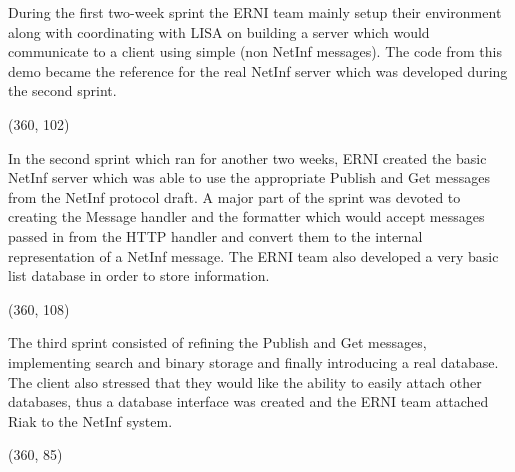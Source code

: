 During the first two-week sprint the ERNI team mainly setup their environment along with coordinating with LISA on building a server which would communicate to a client using simple (non NetInf messages). The code from this demo became the reference for the real NetInf server which was developed during the second sprint.

\framebox(360, 102){
}

In the second sprint which ran for another two weeks, ERNI created the basic NetInf server which was able to use the appropriate Publish and Get messages from the NetInf protocol draft. A major part of the sprint was devoted to creating the Message handler and the formatter which would accept messages passed in from the HTTP handler and convert them to the internal representation of a NetInf message. The ERNI team also developed a very basic list database in order to store information. 


\framebox(360, 108){
}

The third sprint consisted of refining the Publish and Get messages, implementing search and binary storage and finally introducing a real database. The client also stressed that they would like the ability to easily attach other databases, thus a database interface was created and the ERNI team attached Riak to the NetInf system.

\framebox(360, 85){
}

